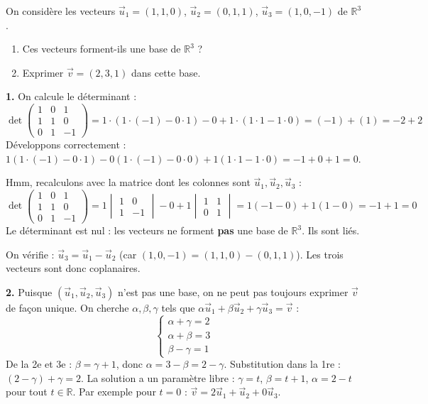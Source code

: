 \documentclass[12pt,a4paper]{article}
\begin{document}
\begin{boiteexercice}
On considère les vecteurs $\vec{u}_1=(1,1,0)$, $\vec{u}_2=(0,1,1)$, $\vec{u}_3=(1,0,-1)$ de $\mathbb{R}^3$.
\begin{enumerate}
  \item Ces vecteurs forment-ils une base de $\mathbb{R}^3$ ?
  \item Exprimer $\vec{v}=(2,3,1)$ dans cette base.
\end{enumerate}
\end{boiteexercice}

\begin{boitecorrige}
\textbf{1.} On calcule le déterminant :
\[
\det\begin{pmatrix}1&0&1\\1&1&0\\0&1&-1\end{pmatrix}
= 1\cdot(1\cdot(-1)-0\cdot1) - 0 + 1\cdot(1\cdot1-1\cdot0)
= (-1) + (1) = -2 + 2
\]
Développons correctement : $1(1\cdot(-1)-0\cdot1) - 0(1\cdot(-1)-0\cdot0) + 1(1\cdot1-1\cdot0) = -1+0+1=0$.

Hmm, recalculons avec la matrice dont les colonnes sont $\vec{u}_1,\vec{u}_2,\vec{u}_3$ :
\[
\det\begin{pmatrix}1&0&1\\1&1&0\\0&1&-1\end{pmatrix}
= 1\begin{vmatrix}1&0\\1&-1\end{vmatrix} - 0 + 1\begin{vmatrix}1&1\\0&1\end{vmatrix}
= 1(-1-0) + 1(1-0) = -1+1 = 0
\]
Le déterminant est nul : les vecteurs ne forment \textbf{pas} une base de $\mathbb{R}^3$. Ils sont liés.

On vérifie : $\vec{u}_3 = \vec{u}_1 - \vec{u}_2$ (car $(1,0,-1)=(1,1,0)-(0,1,1)$). Les trois vecteurs sont donc coplanaires.

\textbf{2.} Puisque $(\vec{u}_1,\vec{u}_2,\vec{u}_3)$ n'est pas une base, on ne peut pas toujours exprimer $\vec{v}$ de façon unique. On cherche $\alpha,\beta,\gamma$ tels que $\alpha\vec{u}_1+\beta\vec{u}_2+\gamma\vec{u}_3=\vec{v}$ :
\[
\begin{cases}\alpha+\gamma=2\\\alpha+\beta=3\\\beta-\gamma=1\end{cases}
\]
De la 2e et 3e : $\beta=\gamma+1$, donc $\alpha = 3-\beta = 2-\gamma$. Substitution dans la 1re : $(2-\gamma)+\gamma=2$. La solution a un paramètre libre : $\gamma=t$, $\beta=t+1$, $\alpha=2-t$ pour tout $t\in\mathbb{R}$. Par exemple pour $t=0$ : $\vec{v} = 2\vec{u}_1 + \vec{u}_2 + 0\vec{u}_3$.
\end{boitecorrige}
\end{document}
